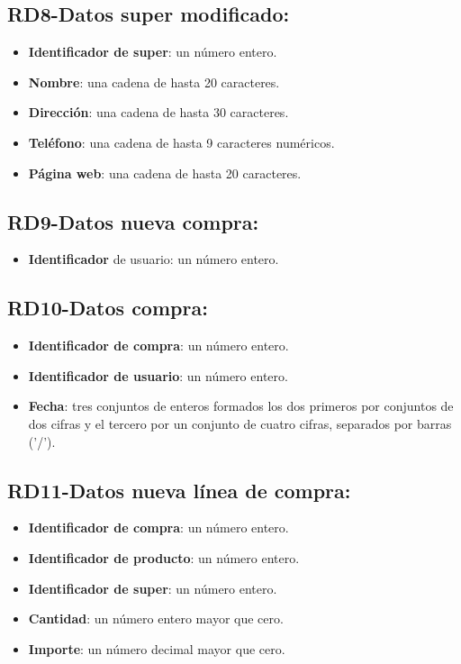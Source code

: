 \documentclass[a4paper,12pt]{report}
\begin{document}
\subsection{RD8-Datos super modificado:}
\label{sec-2-1-8}
\begin{itemize}
\item \textbf{Identificador de super}: un número entero.
\item \textbf{Nombre}:  una cadena de hasta 20 caracteres.
\item \textbf{Dirección}:  una cadena de hasta 30 caracteres.
\item \textbf{Teléfono}: una cadena de hasta 9 caracteres numéricos.
\item \textbf{Página web}: una cadena de hasta 20 caracteres.
\end{itemize}
\subsection{RD9-Datos nueva compra:}
\label{sec-2-1-9}
\begin{itemize}
\item \textbf{Identificador} de usuario: un número entero.
\end{itemize}
\subsection{RD10-Datos compra:}
\label{sec-2-1-10}
\begin{itemize}
\item \textbf{Identificador de compra}: un número entero.
\item \textbf{Identificador de usuario}: un número entero.
\item \textbf{Fecha}: tres conjuntos de enteros formados los dos primeros por conjuntos de dos cifras y el                 tercero por un conjunto de cuatro cifras, separados por barras ('/').
\end{itemize}
\subsection{RD11-Datos nueva línea de compra:}
\label{sec-2-1-11}
\begin{itemize}
\item \textbf{Identificador de compra}: un número entero.
\item \textbf{Identificador de producto}: un número entero.
\item \textbf{Identificador de super}: un número entero.
\item \textbf{Cantidad}: un número entero mayor que cero.
\item \textbf{Importe}: un número decimal mayor que cero.
\end{itemize}
\end{document}
